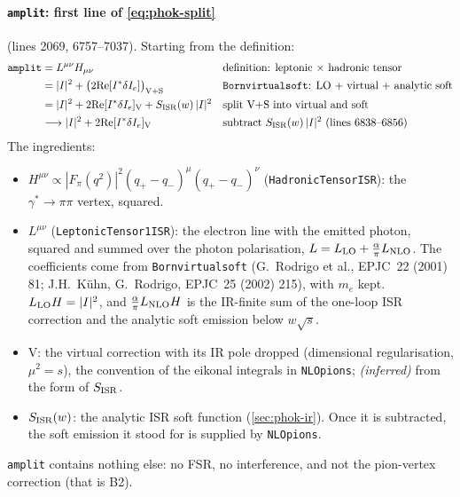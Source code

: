 \documentclass[11pt,a4paper]{article}
\newcommand{\code}[1]{\texttt{#1}}
\begin{document}
\paragraph{\code{amplit}: first line of \cref{eq:phok-split}} (lines 2069, 6757--7037). Starting
from the definition:
\begin{align*}
\code{amplit}
&= L^{\mu\nu}H_{\mu\nu}
  && \text{definition: leptonic $\times$ hadronic tensor}\\
&= |I|^2+\big(2{\rm Re}[I^*\delta I_e]\big)_{\rm V+S}
  && \text{\code{Bornvirtualsoft}: LO + virtual + analytic soft}\\
&= |I|^2+2{\rm Re}[I^*\delta I_e]_{\rm V}+S_{\rm ISR}(w)\,|I|^2
  && \text{split V+S into virtual and soft}\\
&\longrightarrow |I|^2+2{\rm Re}[I^*\delta I_e]_{\rm V}
  && \text{subtract $S_{\rm ISR}(w)\,|I|^2$ (lines 6838--6856)}
\end{align*}
The ingredients:
\begin{itemize}
\item $H^{\mu\nu}\propto|F_\pi(q^2)|^2(q_+-q_-)^\mu(q_+-q_-)^\nu$ (\code{HadronicTensorISR}): the
  $\gamma^*\to\pi\pi$ vertex, squared.
\item $L^{\mu\nu}$ (\code{LeptonicTensor1ISR}): the electron line with the emitted photon,
  squared and summed over the photon polarisation, $L=L_{\rm LO}+\frac{\alpha}{\pi}L_{\rm NLO}$.
  The coefficients come from \code{Bornvirtualsoft} (G.~Rodrigo et al., EPJC~22 (2001) 81;
  J.H.~K\"uhn, G.~Rodrigo, EPJC~25 (2002) 215), with $m_e$ kept. $L_{\rm LO}H=|I|^2$, and
  $\frac{\alpha}{\pi}L_{\rm NLO}H$ is the IR-finite sum of the one-loop ISR correction and the
  analytic soft emission below $w\sqrt s$.
\item V: the virtual correction with its IR pole dropped (dimensional regularisation,
  $\mu^2=s$), the convention of the eikonal integrals in \code{NLOpions}; \emph{(inferred)} from
  the form of $S_{\rm ISR}$.
\item $S_{\rm ISR}(w)$: the analytic ISR soft function (\cref{sec:phok-ir}). Once it is
  subtracted, the soft emission it stood for is supplied by \code{NLOpions}.
\end{itemize}
\code{amplit} contains nothing else: no FSR, no interference, and not the pion-vertex correction
(that is B2).
\end{document}
